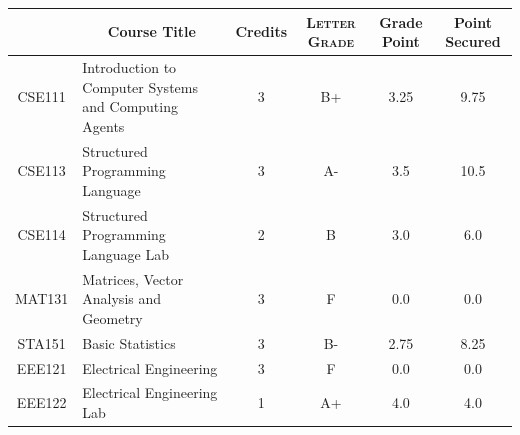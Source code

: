 \documentclass[11pt]{article}
\newcommand*{\numtwo}[1]{\pgfmathprintnumber[
                    fixed, precision=2, fixed zerofill=true]{#1}}
\begin{document}
                \begin{center}
                    \renewcommand{\arraystretch}{1.08}
                    
                \begin{tabular}{|c|l|c|>{\scshape}c|c|c|}
                \hline  \rule[-1ex]{0pt}{3.5ex} {\centering{\bf Course Code}} &  \multicolumn{1}{c|}{\textbf{Course Title}}  & {\bf Credits} & {\bf Letter Grade} & {\bf Grade Point} & {\bf Point Secured}  \\ 
                \hline   CSE111 &  Introduction to Computer Systems and Computing Agents		 & 3 & B+ & 3.25 & 9.75 \\ %
                \hline   CSE113 &  Structured Programming Language		 & 3 & A- & 3.5 & 10.5 \\ %
                \hline   CSE114 &  Structured Programming Language Lab		 & 2 & B & 3.0 & 6.0 \\ %
                \hline   MAT131 &  Matrices, Vector Analysis and Geometry		 & 3 & F & 0.0 & 0.0 \\ %
                \hline   STA151 &  Basic Statistics		 & 3 & B- & 2.75 & 8.25 \\ %
                \hline   EEE121 &  Electrical Engineering		 & 3 & F & 0.0 & 0.0 \\ %
                \hline   EEE122 &  Electrical Engineering Lab		 & 1 & A+ & 4.0 & 4.0 \\ %

\hline                %
                \end{tabular}
                \end{center}
                \renewcommand{\arraystretch}{1.03}
\end{document}

